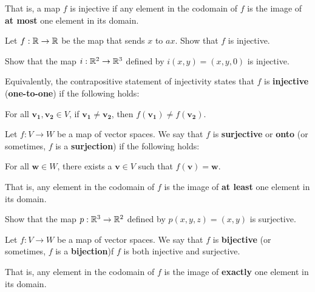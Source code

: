     That is, a map $f$ is injective if any element in the codomain of $f$ is the image of \textbf{at most} one element in its domain.  

\begin{example}
    Let $f: \mathbb{R} \to \mathbb{R}$ be the map that sends $x$ to $ax$. Show that $f$ is injective.
\end{example}


\begin{example}
Show that the map $i: \mathbb{R}^2 \to \mathbb{R}^3$ defined by $i(x,y) = (x,y,0)$ is injective.
\end{example}

\begin{example}
    Equivalently, the contrapositive statement of injectivity states that $f$ is \textbf{injective} (\textbf{one-to-one}) if the following holds:
    
    \begin{center}
    For all $\bm{v_1}, \bm{v_2} \in V$, if $\bm{v_1} \neq \bm{v_2}$, then $f(\bm{v_1}) \neq f(\bm{v_2})$.
        
    \end{center}
    
\end{example}

\begin{definition}
    Let $f: V \to W$ be a map of vector spaces.  We say that $f$ is \textbf{surjective} or \textbf{onto}  (or sometimes, $f$ is a \textbf{surjection}) if the following holds:
    
    \begin{center}
        
    For all $\bm{w} \in W$, there exists a $\bm{v} \in V$ such that $f(\bm{v}) = \bm{w}$.
    \end{center}
    
    That is, any element in the codomain of $f$ is the image of \textbf{at least} one element in its domain.  
\end{definition}

\begin{example}
Show that the map $p: \mathbb{R}^3 \to \mathbb{R}^2$ defined by $p(x,y,z) = (x,y)$ is surjective.
\end{example}

\begin{definition}
    Let $f: V \to W$ be a map of vector spaces.  We say that $f$ is \textbf{bijective}  (or sometimes, $f$ is a \textbf{bijection})f $f$ is both injective and surjective.
    
    That is, any element in the codomain of $f$ is the image of \textbf{exactly} one element in its domain.  
\end{definition}





